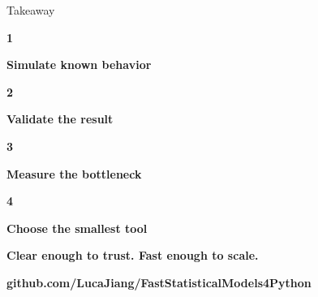 \documentclass[final]{beamer}
\newlength{\sepwidth}
\newlength{\colwidth}
\newcommand{\separatorcolumn}{\begin{column}{\sepwidth}\end{column}}
\newcommand{\practicalstep}[3]{%
  \begin{minipage}[c]{0.44\linewidth}
    \centering
    {\Large\bfseries\color{#1}#2}\par
    {\large\bfseries\color{ink}#3}
  \end{minipage}
}
\begin{document}
\begin{frame}[t]
\begin{columns}[t,totalwidth=0.94\paperwidth]
\begin{column}{\colwidth}
  \begin{alertblock}{Takeaway}
    \centering
    \practicalstep{cityured}{1}{Simulate known behavior}
    \hfill
    \practicalstep{threadteal}{2}{Validate the result}
    \vspace{0.55em}\par
    \hfill
    \practicalstep{cityuorange}{3}{Measure the bottleneck}
    \hfill
    \practicalstep{jaxberry}{4}{Choose the smallest tool}
    \vspace{0.55em}

    {\Large\bfseries\color{cityumaroon}Clear enough to trust. Fast enough to scale.}\par
    \vspace{0.25em}
    {\normalsize\bfseries\color{ink}github.com/LucaJiang/FastStatisticalModels4Python}
  \end{alertblock}
\end{column}

\separatorcolumn
\end{columns}
\end{frame}
\end{document}
